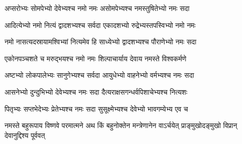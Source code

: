 \twolineshloka
{अप्सरोभ्यः सोमपेभ्यो देवेभ्यश्च नमो नमः}
{असोमपेभ्यश्च नमस्तुषितेभ्यो नमः सदा}

\twolineshloka
{आदित्येभ्यो नमो नित्यं द्वादशभ्यश्च सर्वदा}
{एकादशभ्यो रुद्रेभ्यस्तपस्विभ्यो नमो नमः}

\twolineshloka
{नमो नासत्यदस्रायामश्विभ्यां नित्यमेव हि}
{साध्येभ्यो द्वादशभ्यश्च पौराणेभ्यो नमः सदा}

\twolineshloka
{एकोनपञ्चशते च मरुद्भयश्च नमो नमः}
{शिल्पाचार्याय देवाय नमस्ते विश्वकर्मणे}

\twolineshloka
{अष्टभ्यो लोकपालेभ्यः सानुगेभ्यश्च सर्वदा}
{आयुधेभ्यो वाहनेभ्यो वर्मभ्यश्च नमः सदा}

\twolineshloka
{आसनेभ्यो दुन्दुभिभ्यो देवेभ्यश्च नमः सदा}
{दैत्यराक्षसगन्धर्वपिशाचेभ्यश्च नित्यशः}

\twolineshloka
{पितृभ्यः सप्तभेदेभ्यः प्रेतेभ्यश्च नमः सदा}
{सुसूक्ष्मेभ्यश्च देवेभ्यो भावगम्येभ्य एव च}

\threelineshloka
{नमस्ते बहुरूपाय विष्णवे परमात्मने}
{अथ किं बहुनोक्तेन मन्त्रेणानेन वाऽर्चयेत्}
{प्राङ्मुखोदङ्मुखो विप्रान् देवानुद्दिश्य पूर्ववत्}

\closesection